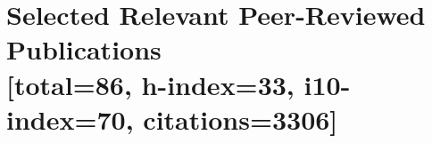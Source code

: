\documentclass[11pt]{article}
\begin{document}
\begin{tabular}{ll}
\end{tabular}


\section*{Selected Relevant Peer-Reviewed Publications \\  \small{[total=86, h-index=33, i10-index=70, citations=3306]}}
\vspace{-0.5cm}
\setlength{\extrarowheight}{10pt}
\end{document}
